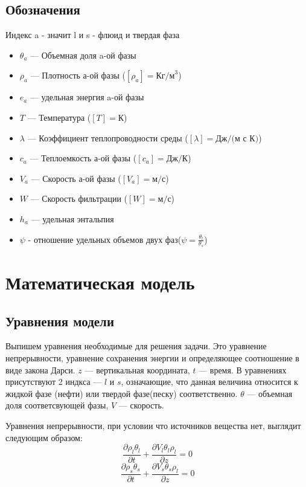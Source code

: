 \documentclass[12pt,a4paper]{article}
\newcommand{\pd}[2]{\frac{\partial #1}{\partial #2}}
\begin{document}
\subsection{Обозначения}
Индекс a - значит l и s - флюид и твердая фаза
\begin{itemize}
\item $\theta_a $ --- Объемная доля a-ой фазы
\item $\rho_a$ --- Плотность а-ой фазы ($[\rho_a] = \text{Кг/м}^3$)
\item $e_a$ --- удельная энергия a-ой фазы
\item $T $ --- Температура ($[T] =\text{К}$)
\item $\lambda$ --- Коэффициент теплопроводности среды ($[\lambda] = \text{Дж/(м с К)}$)
\item $c_a$ --- Теплоемкость а-ой фазы ($[c_a] = \text{Дж/К}$)
\item $V_a$ --- Скорость а-ой фазы ($[V_a] = \text{м/с} $)
\item $W$ --- Скорость фильтрации ($[W] = \text{м/с} $)
\item $h_a$ --- удельная энтальпия
\item $\psi$ - отношение удельных объемов двух фаз($\psi = \frac{\theta_l}{\theta_s} $)
\end{itemize}


\newpage
\section{Математическая модель}
\subsection{Уравнения модели}
Выпишем уравнения необходимые для решения задачи. Это уравнение непрерывности, уравнение сохранения энергии и определяющее соотношение в виде закона Дарси.  $z$ --- вертикальная координата, $t$ --- время. В уравнениях присутствуют 2 индкса --- $ l $ и $ s$, означающие, что данная величина относится к жидкой фазе (нефти) или твердой фазе(песку) соответственно. $\theta$ --- объемная доля соответсвующей фазы, $ V $ --- скорость.

Уравнения непрерывности, при условии что источников вещества нет, выглядит следующим образом:
\begin{equation}
\pd{\rho_l\theta_l}{t} + \pd{V_l\theta_l\rho_l}{z} =0
\label{eq:contin_l}
\end{equation}
\begin{equation}
\pd{\rho_s\theta_s}{t} + \pd{V_s\theta_s\rho_l}{z} =0
\label{eq:contin_s}
\end{equation}
\end{document}
